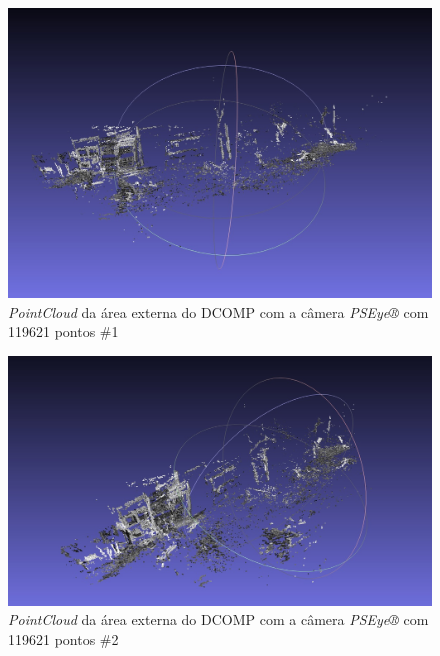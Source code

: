 \begin{figure}[H]
	\centering
		\includegraphics[width= \textwidth]{Imagens/figura4-5.jpg}
	\caption{\textit{PointCloud} da área externa do DCOMP com a câmera \textit{PSEye®} com 119621 pontos \#1}
	\label{fig4:5}
\end{figure}

\begin{figure}[H]
	\centering
		\includegraphics[width= \textwidth]{Imagens/figura4-6.jpg}
	\caption{\textit{PointCloud} da área externa do DCOMP com a câmera \textit{PSEye®} com 119621 pontos \#2}
	\label{fig4:6}
\end{figure}


